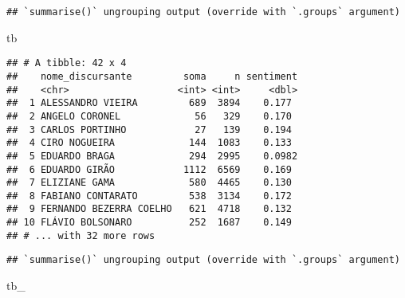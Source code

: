 \documentclass[
]{article}
\newenvironment{Shaded}{\begin{snugshade}}{\end{snugshade}}
\newcommand{\CommentTok}[1]{\textcolor[rgb]{0.56,0.35,0.01}{\textit{#1}}}
\newcommand{\DataTypeTok}[1]{\textcolor[rgb]{0.13,0.29,0.53}{#1}}
\newcommand{\KeywordTok}[1]{\textcolor[rgb]{0.13,0.29,0.53}{\textbf{#1}}}
\newcommand{\NormalTok}[1]{#1}
\newcommand{\OperatorTok}[1]{\textcolor[rgb]{0.81,0.36,0.00}{\textbf{#1}}}
\newcommand{\StringTok}[1]{\textcolor[rgb]{0.31,0.60,0.02}{#1}}
\begin{document}
\begin{verbatim}
## `summarise()` ungrouping output (override with `.groups` argument)
\end{verbatim}

\begin{Shaded}
\begin{Highlighting}[]
\NormalTok{tb}
\end{Highlighting}
\end{Shaded}

\begin{verbatim}
## # A tibble: 42 x 4
##    nome_discursante         soma     n sentiment
##    <chr>                   <int> <int>     <dbl>
##  1 ALESSANDRO VIEIRA         689  3894    0.177 
##  2 ANGELO CORONEL             56   329    0.170 
##  3 CARLOS PORTINHO            27   139    0.194 
##  4 CIRO NOGUEIRA             144  1083    0.133 
##  5 EDUARDO BRAGA             294  2995    0.0982
##  6 EDUARDO GIRÃO            1112  6569    0.169 
##  7 ELIZIANE GAMA             580  4465    0.130 
##  8 FABIANO CONTARATO         538  3134    0.172 
##  9 FERNANDO BEZERRA COELHO   621  4718    0.132 
## 10 FLÁVIO BOLSONARO          252  1687    0.149 
## # ... with 32 more rows
\end{verbatim}

\begin{Shaded}
\end{Shaded}

\begin{verbatim}
## `summarise()` ungrouping output (override with `.groups` argument)
\end{verbatim}

\begin{Shaded}
\begin{Highlighting}[]
\NormalTok{tb_}
\end{Highlighting}
\end{Shaded}
\end{document}
